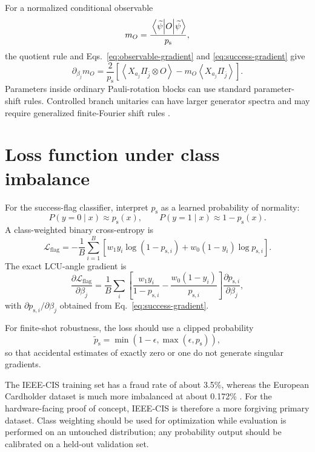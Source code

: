 \documentclass[11pt,a4paper]{article}
\newcommand{\psucc}{p_{\mathrm{s}}}
\newcommand{\expect}[1]{\left\langle #1 \right\rangle}
\begin{document}
For a normalized conditional observable
\begin{equation}
    m_O=\frac{\mel{\widetilde\psi}{O}{\widetilde\psi}}{\psucc},
\end{equation}
the quotient rule and Eqs.~\eqref{eq:observable-gradient} and
\eqref{eq:success-gradient} give
\begin{equation}
\boxed{
\partial_{\beta_j}m_O
=
\frac{2}{\psucc}\left[
\expect{X_{a_j}\Pi_{\bar j}\otimes O}
-m_O\expect{X_{a_j}\Pi_{\bar j}}
\right].
}
\end{equation}
Parameters inside ordinary Pauli-rotation blocks can use standard parameter-shift rules. Controlled branch unitaries can have larger generator spectra and may require generalized finite-Fourier shift rules \cite{Wierichs2022}.

\section{Loss function under class imbalance}

For the success-flag classifier, interpret $\psucc$ as a learned probability of normality:
\begin{equation}
P(y=0\mid x)\approx \psucc(x),\qquad
P(y=1\mid x)\approx 1-\psucc(x).
\end{equation}
A class-weighted binary cross-entropy is
\begin{equation}
\mathcal L_{\mathrm{flag}}
=-\frac{1}{B}\sum_{i=1}^B
\left[
 w_1y_i\log(1-p_{\mathrm{s},i})
 +w_0(1-y_i)\log p_{\mathrm{s},i}
\right].
\label{eq:weighted-bce}
\end{equation}
The exact LCU-angle gradient is
\begin{equation}
\frac{\partial\mathcal L_{\mathrm{flag}}}{\partial\beta_j}
=
\frac{1}{B}\sum_i
\left[
\frac{w_1y_i}{1-p_{\mathrm{s},i}}
-
\frac{w_0(1-y_i)}{p_{\mathrm{s},i}}
\right]
\frac{\partial p_{\mathrm{s},i}}{\partial\beta_j},
\end{equation}
with $\partial p_{\mathrm{s},i}/\partial\beta_j$ obtained from
Eq.~\eqref{eq:success-gradient}.

For finite-shot robustness, the loss should use a clipped probability
\begin{equation}
\widetilde p_{\mathrm{s}}
=
\min(1-\epsilon,\max(\epsilon,\psucc)),
\end{equation}
so that accidental estimates of exactly zero or one do not generate singular gradients.

The IEEE-CIS training set has a fraud rate of about 3.5\%, whereas the European Cardholder dataset is much more imbalanced at about 0.172\% \cite{HSBC2026}. For the hardware-facing proof of concept, IEEE-CIS is therefore a more forgiving primary dataset. Class weighting should be used for optimization while evaluation is performed on an untouched distribution; any probability output should be calibrated on a held-out validation set.
\end{document}
